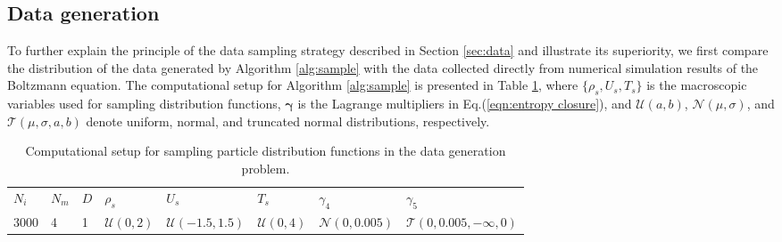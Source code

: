 \documentclass[preprint,3p,12pt,sort&compress]{elsarticle}
\begin{document}
\subsection{Data generation}

To further explain the principle of the data sampling strategy described in Section \ref{sec:data} and illustrate its superiority, we first compare the distribution of the data generated by Algorithm \ref{alg:sample} with the data collected directly from numerical simulation results of the Boltzmann equation.
The computational setup for Algorithm \ref{alg:sample} is presented in Table \ref{tab:sample}, where $\{\rho_s,U_s,T_s\}$ is the macroscopic variables used for sampling distribution functions, $\boldsymbol\gamma$ is the Lagrange multipliers in Eq.(\ref{eqn:entropy closure}), and $\mathcal U(a,b)$, $\mathcal N(\mu,\sigma)$, and $\mathcal T(\mu,\sigma,a,b)$ denote uniform, normal, and truncated normal distributions, respectively.
\begin{table}[htbp]
	\caption{Computational setup for sampling particle distribution functions in the data generation problem.}
	\centering
	\begin{tabular}{llllllll} 
		\hline
		$N_i$ & $N_m$ & $D$ & $\rho_s$ & $U_s$ & $T_s$ & $\gamma_4$ & $\gamma_5$ \\
		$3000$ & 4 & 1 & $\mathcal U(0,2)$ & $\mathcal U(-1.5,1.5)$ & $\mathcal U(0,4)$ & $\mathcal N(0,0.005)$ & $\mathcal T(0,0.005,-\infty,0)$ \\
		\hline
	\end{tabular} 
	\label{tab:sample}
\end{table}
\end{document}
